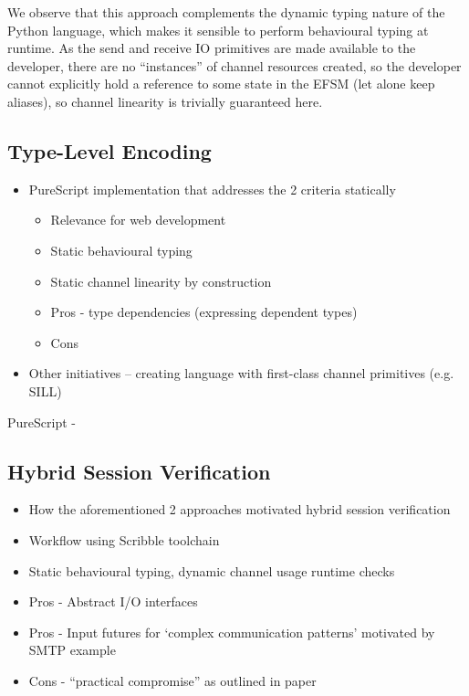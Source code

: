 We observe that this approach complements the dynamic typing nature of the Python language, which makes it sensible to perform behavioural typing at runtime. As the send and receive IO primitives are made available to the developer, there are no ``instances'' of channel resources created, so the developer cannot explicitly hold a reference to some state in the EFSM (let alone keep aliases), so channel linearity is trivially guaranteed here.

\subsection{Type-Level Encoding}
\begin{itemize}
\item PureScript implementation that addresses the 2 criteria statically
\begin{itemize}
\item Relevance for web development
\item Static behavioural typing
\item Static channel linearity by construction
\item Pros - type dependencies (expressing dependent types)
\item Cons
\end{itemize}
\item Other initiatives -- creating language with first-class channel primitives (e.g. SILL)
\end{itemize}

PureScript - \cite{PureScript2019}

\subsection{Hybrid Session Verification}
\begin{itemize}
\item How the aforementioned 2 approaches motivated hybrid session verification
\item Workflow using Scribble toolchain 
\item Static behavioural typing, dynamic channel usage runtime checks
\item Pros - Abstract I/O interfaces
\item Pros - Input futures for `complex communication patterns' motivated by SMTP example
\item Cons - ``practical compromise'' as outlined in paper
\end{itemize}

